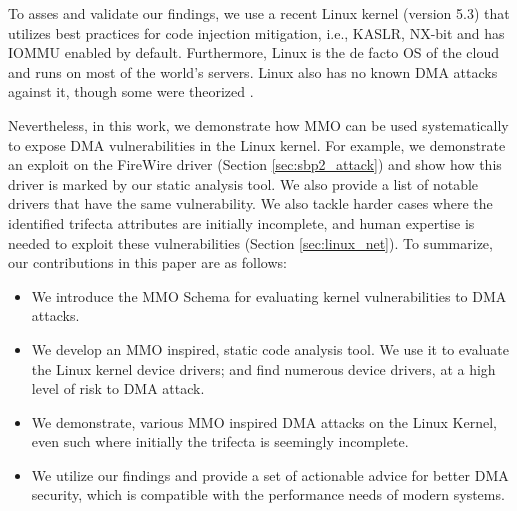 To asses and validate our findings, we use a recent Linux kernel (version 5.3) that utilizes best practices for code injection mitigation, i.e., KASLR, NX-bit and has IOMMU enabled by default. Furthermore, Linux is the de facto OS of the cloud and runs on most of the world's servers. Linux also has no known DMA attacks against it, though some were theorized \cite{MMT16,thunder}. 

Nevertheless, in this work, we demonstrate how MMO can be used systematically to expose DMA vulnerabilities in the Linux kernel. For example, we demonstrate an exploit on the FireWire \spb driver (Section \ref{sec:sbp2_attack}) and show how this driver is marked by our static analysis tool. We also provide a list of notable drivers that have the same vulnerability. We also tackle harder cases where the identified trifecta attributes are initially incomplete, and human expertise is needed to exploit these vulnerabilities (Section \ref{sec:linux_net}). To summarize, our contributions in this paper are as follows:
\begin{itemize}
    \item We introduce the MMO Schema for evaluating kernel vulnerabilities to DMA attacks. 
    \item We develop an MMO inspired, static code analysis tool. We use it to evaluate the Linux kernel device drivers; and find numerous device drivers, at a high level of risk to DMA attack.
    \item We demonstrate, various MMO inspired DMA attacks on the Linux Kernel, even such where initially the trifecta is seemingly incomplete. 
    \item We utilize our findings and provide a set of actionable advice for better DMA security, which is compatible with the performance needs of modern systems.
\end{itemize}